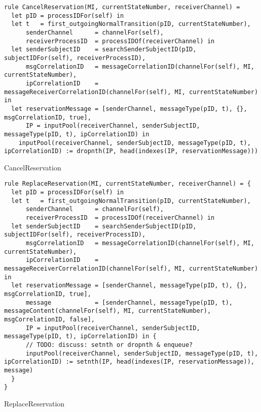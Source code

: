 \begin{listing}[H]
\begin{verbatim}
rule CancelReservation(MI, currentStateNumber, receiverChannel) =
  let pID = processIDFor(self) in
  let t   = first_outgoingNormalTransition(pID, currentStateNumber),
      senderChannel      = channelFor(self),
      receiverProcessID  = processIDOf(receiverChannel) in
  let senderSubjectID    = searchSenderSubjectID(pID, subjectIDFor(self), receiverProcessID),
      msgCorrelationID   = messageCorrelationID(channelFor(self), MI, currentStateNumber),
      ipCorrelationID    = messageReceiverCorrelationID(channelFor(self), MI, currentStateNumber) in
  let reservationMessage = [senderChannel, messageType(pID, t), {}, msgCorrelationID, true],
      IP = inputPool(receiverChannel, senderSubjectID, messageType(pID, t), ipCorrelationID) in
    inputPool(receiverChannel, senderSubjectID, messageType(pID, t), ipCorrelationID) := dropnth(IP, head(indexes(IP, reservationMessage)))
\end{verbatim}
\caption{CancelReservation}
\label{lst:asm:CancelReservation}
\end{listing}




\begin{listing}[H]
\begin{verbatim}
rule ReplaceReservation(MI, currentStateNumber, receiverChannel) = {
  let pID = processIDFor(self) in
  let t   = first_outgoingNormalTransition(pID, currentStateNumber),
      senderChannel      = channelFor(self),
      receiverProcessID  = processIDOf(receiverChannel) in
  let senderSubjectID    = searchSenderSubjectID(pID, subjectIDFor(self), receiverProcessID),
      msgCorrelationID   = messageCorrelationID(channelFor(self), MI, currentStateNumber),
      ipCorrelationID    = messageReceiverCorrelationID(channelFor(self), MI, currentStateNumber) in
  let reservationMessage = [senderChannel, messageType(pID, t), {}, msgCorrelationID, true],
      message            = [senderChannel, messageType(pID, t), messageContent(channelFor(self), MI, currentStateNumber), msgCorrelationID, false],
      IP = inputPool(receiverChannel, senderSubjectID, messageType(pID, t), ipCorrelationID) in {
      // TODO: discuss: setnth or dropnth & enqueue?
      inputPool(receiverChannel, senderSubjectID, messageType(pID, t), ipCorrelationID) := setnth(IP, head(indexes(IP, reservationMessage)), message)
  }
}
\end{verbatim}
\caption{ReplaceReservation}
\label{lst:asm:ReplaceReservation}
\end{listing}






